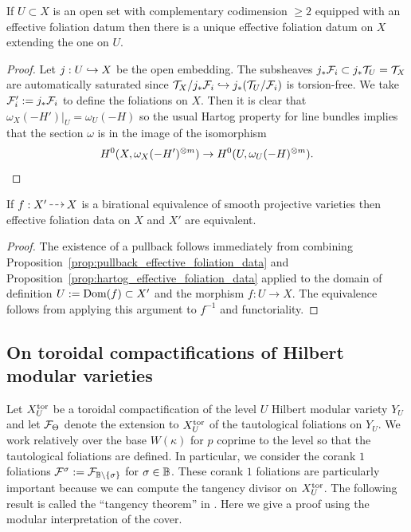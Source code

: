 \documentclass[main.tex]{subfiles}
\begin{document}
{\begin{prop} \label{prop:hartog_effective_foliation_data}
If $U \subset X$ is an open set with complementary codimension $\ge 2$ equipped with an effective foliation datum then there is a unique effective foliation datum on $X$ extending the one on $U$. 
\end{prop}

\begin{proof}
Let $j : U \hookrightarrow X$ be the open embedding. The subsheaves $j_* \mathcal{F}_i \subset j_* \mathcal{T}_U = \mathcal{T}_X$ are automatically saturated since $\mathcal{T}_X / j_* \mathcal{F}_i \hookrightarrow j_* (\mathcal{T}_U / \mathcal{F}_i)$ is torsion-free. We take $\mathcal{F}_i' := j_* \mathcal{F}_i$ to define the foliations on $X$. Then it is clear that $\omega_{X}(-H')|_U = \omega_U(-H)$ so the usual Hartog property for line bundles implies that the section $\omega$ is in the image of the isomorphism
\[ H^0(X, \omega_{X}(-H')^{\otimes m}) \to H^0(U, \omega_{U}(-H)^{\otimes m}). \]
\end{proof}

\begin{cor} \label{cor:birational_equivalence}
If $f : X' \rat X$ is a birational equivalence of smooth projective varieties then effective foliation data on $X$ and $X'$ are equivalent.
\end{cor}

\begin{proof}
The existence of a pullback follows immediately from combining Proposition~\ref{prop:pullback_effective_foliation_data} and Proposition~\ref{prop:hartog_effective_foliation_data} applied to the domain of definition $U := \operatorname{\mathrm{Dom}}(f) \subset X'$ and the morphism $f : U \to X$. The equivalence follows from applying this argument to $f^{-1}$ and functoriality. 
\end{proof}




\subsection{On toroidal compactifications of Hilbert modular varieties}

Let $X_U^{\mathrm{tor}}$ be a toroidal compactification of the level $U$ Hilbert modular variety $Y_U$ and let $\mathcal{F}_{\Theta}$ denote the extension to $X_U^{\mathrm{tor}}$ of the tautological foliations on $Y_U$. We work relatively over the base $W(\kappa)$ for $p$ coprime to the level so that the tautological foliations are defined. In particular, we consider the corank $1$ foliations $\mathcal{F}^{\sigma} := \mathcal{F}_{\mathbb{B} \setminus \{ \sigma \}}$ for $\sigma \in \mathbb{B}$. These corank $1$ foliations are particularly important because we can compute the tangency divisor on $X_U^{\mathrm{tor}}$. The following result is called the ``tangency theorem'' in \cite{rousseau:curves_hilbert_modular}. Here we give a proof using the modular interpretation of the cover.

}
\end{document}
